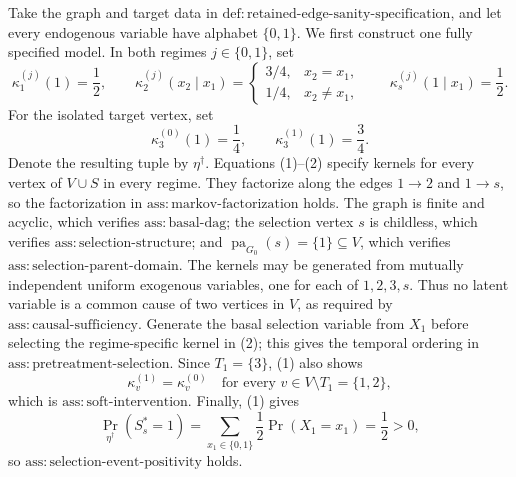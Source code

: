 Take the graph and target data in \(\mathrm{def:retained\mbox{-}edge\mbox{-}sanity\mbox{-}specification}\), and let every endogenous variable have alphabet \(\{0,1\}\).  We first construct one fully specified model.  In both regimes \(j\in\{0,1\}\), set
\[
 \kappa _1^{(j)}(1)=\frac12,
 \qquad
 \kappa _2^{(j)}(x_2\mid x_1)
 =
 \begin{cases}
  3/4,&x_2=x_1,\\
  1/4,&x_2\ne x_1,
 \end{cases}
 \qquad
 \kappa _s^{(j)}(1\mid x_1)=\frac12.
 \tag{1}
\]
For the isolated target vertex, set
\[
 \kappa _3^{(0)}(1)=\frac14,
 \qquad
 \kappa _3^{(1)}(1)=\frac34.
 \tag{2}
\]
Denote the resulting tuple by \(\eta^\dagger\).  Equations (1)--(2) specify kernels for every vertex of \(V\cup S\) in every regime.  They factorize along the edges \(1\to2\) and \(1\to s\), so the factorization in \(\mathrm{ass:markov\mbox{-}factorization}\) holds.  The graph is finite and acyclic, which verifies \(\mathrm{ass:basal\mbox{-}dag}\); the selection vertex \(s\) is childless, which verifies \(\mathrm{ass:selection\mbox{-}structure}\); and \(\operatorname{pa}_{G_0}(s)=\{1\}\subseteq V\), which verifies \(\mathrm{ass:selection\mbox{-}parent\mbox{-}domain}\).  The kernels may be generated from mutually independent uniform exogenous variables, one for each of \(1,2,3,s\).  Thus no latent variable is a common cause of two vertices in \(V\), as required by \(\mathrm{ass:causal\mbox{-}sufficiency}\).  Generate the basal selection variable from \(X_1\) before selecting the regime-specific kernel in (2); this gives the temporal ordering in \(\mathrm{ass:pretreatment\mbox{-}selection}\).  Since \(T_1=\{3\}\), (1) also shows
\[
 \kappa_v^{(1)}=\kappa_v^{(0)}
 \quad\text{for every }v\in V\setminus T_1=\{1,2\},
 \tag{3}
\]
which is \(\mathrm{ass:soft\mbox{-}intervention}\).  Finally, (1) gives
\[
 \Pr_{\eta^\dagger}(S_s^*=1)
 =\sum_{x_1\in\{0,1\}}\frac12\Pr(X_1=x_1)
 =\frac12>0,
 \tag{4}
\]
so \(\mathrm{ass:selection\mbox{-}event\mbox{-}positivity}\) holds.

